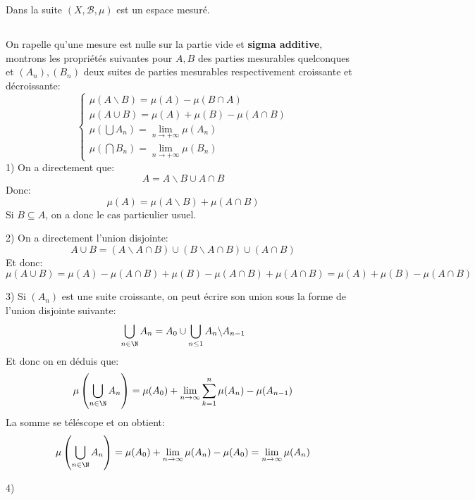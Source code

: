 \documentclass{report}
\begin{document}
   Dans la suite \((X, \mathscr{B}, \mu)\) est un espace mesuré.
   \subsection*{}
   On rapelle qu'une mesure est nulle sur la partie vide et \textbf{sigma additive}, montrons les propriétés suivantes pour \( A, B \) des parties mesurables quelconques et \( (A_n), (B_n) \) deux suites de parties mesurables respectivement croissante et décroissante:
   \[ 
      \begin{cases}
         \mu(A \backslash B) = \mu(A) - \mu(B \cap A)\\
         \mu(A \cup B) = \mu(A) + \mu(B) - \mu(A \cap B)\\
         \mu(\bigcup A_n) = \lim_{n \rightarrow +\infty} \mu(A_n)\\
         \mu(\bigcap B_n) = \lim_{n \rightarrow + \infty} \mu(B_n)
      \end{cases} 
   \]
   1) On a directement que:
   \[ 
      A = A \backslash B \cup A \cap B 
   \]
   Donc:
   \[ 
      \mu(A) = \mu(A \backslash B) + \mu(A \cap B) 
   \]
   Si \( B \subseteq A \), on a donc le cas particulier usuel.\<

   2) On a directement l'union disjointe:
   \[ 
      A  \cup B = (A \backslash A \cap B) \cup (B \backslash A \cap B) \cup (A \cap B)  
   \]
   Et donc:
   \[ 
      \mu(A \cup B) = \mu(A) - \mu(A \cap B) + \mu(B) - \mu(A \cap B) + \mu(A \cap B) = \mu(A) + \mu(B) - \mu(A \cap B)
   \]\<

   3) Si \( (A_n) \) est une suite croissante, on peut écrire son union sous la forme de l'union disjointe suivante:
   \[ 
      \bigcup_{n \in \N} A_n = A_0 \cup \bigcup_{n \leq 1} A_n \backslash A_{n-1}
   \]
   Et donc on en déduis que:
   \[ 
      \mu\left(\bigcup_{n \in \N} A_n\right) = \mu(A_0) + \lim_{n \rightarrow \infty} \sum_{k=1}^n \mu(A_n) - \mu(A_{n-1}) 
   \]
   La somme se téléscope et on obtient:
   \[ 
      \mu\left(\bigcup_{n \in \N} A_n\right) = \mu(A_0) + \lim_{n \rightarrow \infty} \mu(A_n) - \mu(A_0) = \lim_{n \rightarrow \infty} \mu(A_n) 
   \]

   4) 
   
\end{document}
